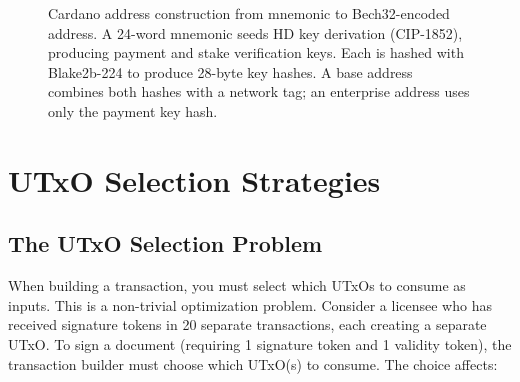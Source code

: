 \begin{figure}[htbp]
\caption{Cardano address construction from mnemonic to Bech32-encoded
address. A 24-word mnemonic seeds HD key derivation (CIP-1852), producing
payment and stake verification keys. Each is hashed with Blake2b-224 to
produce 28-byte key hashes. A base address combines both hashes with a
network tag; an enterprise address uses only the payment key hash.}
\label{fig:address-construction}
\end{figure}


\section{UTxO Selection Strategies}
\label{sec:utxo-selection}

\subsection{The UTxO Selection Problem}

When building a transaction, you must select which UTxOs to consume as
inputs. This is a non-trivial optimization problem. Consider a licensee
who has received signature tokens in 20 separate transactions, each
creating a separate UTxO. To sign a document (requiring 1 signature
token and 1 validity token), the transaction builder must choose which
UTxO(s) to consume. The choice affects:

